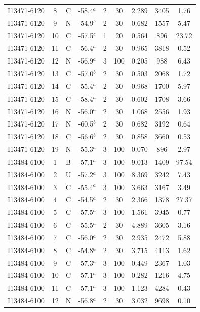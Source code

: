 \begin{table}
\begin{tabular}{ccccccccc}
I13471-6120 & 8 & C & -58.4$^{a}$ & 2 & 30 & 2.289 & 3405 & 1.76 \\
I13471-6120 & 9 & N & -54.9$^{b}$ & 2 & 30 & 0.682 & 1557 & 5.47 \\
I13471-6120 & 10 & C & -57.5$^{c}$ & 1 & 20 & 0.564 & 896 & 23.72 \\
I13471-6120 & 11 & C & -56.4$^{a}$ & 2 & 30 & 0.965 & 3818 & 0.52 \\
I13471-6120 & 12 & N & -56.9$^{a}$ & 3 & 100 & 0.205 & 988 & 6.43 \\
I13471-6120 & 13 & C & -57.0$^{b}$ & 2 & 30 & 0.503 & 2068 & 1.72 \\
I13471-6120 & 14 & C & -55.4$^{a}$ & 2 & 30 & 0.968 & 1700 & 5.97 \\
I13471-6120 & 15 & C & -58.4$^{a}$ & 2 & 30 & 0.602 & 1708 & 3.66 \\
I13471-6120 & 16 & N & -56.0$^{a}$ & 2 & 30 & 1.068 & 2556 & 1.93 \\
I13471-6120 & 17 & N & -60.5$^{b}$ & 2 & 30 & 0.682 & 3192 & 0.64 \\
I13471-6120 & 18 & C & -56.6$^{b}$ & 2 & 30 & 0.858 & 3660 & 0.53 \\
I13471-6120 & 19 & N & -55.3$^{a}$ & 3 & 100 & 0.070 & 896 & 2.97 \\
I13484-6100 & 1 & B & -57.1$^{a}$ & 3 & 100 & 9.013 & 1409 & 97.54 \\
I13484-6100 & 2 & U & -57.2$^{a}$ & 3 & 100 & 8.369 & 3242 & 7.43 \\
I13484-6100 & 3 & C & -55.4$^{a}$ & 3 & 100 & 3.663 & 3167 & 3.49 \\
I13484-6100 & 4 & C & -54.5$^{a}$ & 2 & 30 & 2.366 & 1378 & 27.37 \\
I13484-6100 & 5 & C & -57.5$^{a}$ & 3 & 100 & 1.561 & 3945 & 0.77 \\
I13484-6100 & 6 & C & -55.5$^{a}$ & 2 & 30 & 4.889 & 3605 & 3.16 \\
I13484-6100 & 7 & C & -56.0$^{a}$ & 2 & 30 & 2.935 & 2472 & 5.88 \\
I13484-6100 & 8 & C & -54.8$^{a}$ & 2 & 30 & 3.715 & 4113 & 1.62 \\
I13484-6100 & 9 & C & -57.3$^{a}$ & 3 & 100 & 0.449 & 2367 & 1.03 \\
I13484-6100 & 10 & C & -57.1$^{a}$ & 3 & 100 & 0.282 & 1216 & 4.75 \\
I13484-6100 & 11 & C & -57.1$^{a}$ & 3 & 100 & 1.123 & 4284 & 0.43 \\
I13484-6100 & 12 & N & -56.8$^{a}$ & 2 & 30 & 3.032 & 9698 & 0.10 \\

\end{tabular}
\end{table}
